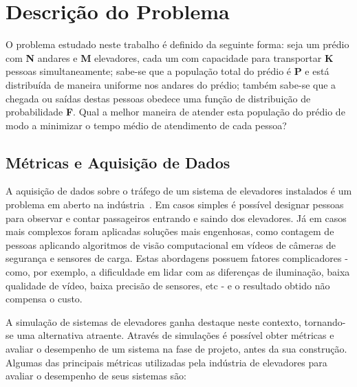 \chapter{\label{chap:problem}Descrição do Problema}

O problema estudado neste trabalho é definido da seguinte forma: seja um prédio com \textbf{N} andares e \textbf{M} elevadores, cada um com capacidade para transportar \textbf{K} pessoas simultaneamente; sabe-se que a população total do prédio é \textbf{P} e está distribuída de maneira uniforme nos andares do prédio; também sabe-se que a chegada ou saídas destas pessoas obedece uma função de distribuição de probabilidade \textbf{F}. Qual a melhor maneira de atender esta população do prédio de modo a minimizar o tempo médio de atendimento de cada pessoa?

\section{Métricas e Aquisição de Dados}

A aquisição de dados sobre o tráfego de um sistema de elevadores instalados é um problema em aberto na indústria~\cite{KOEHLEROTTIGER02}. Em casos simples é possível designar pessoas para observar e contar passageiros entrando e saindo dos elevadores. Já em casos mais complexos foram aplicadas soluções mais engenhosas, como contagem de pessoas aplicando algoritmos de visão computacional em vídeos de câmeras de segurança e sensores de carga. Estas abordagens possuem fatores complicadores - como, por exemplo, a dificuldade em lidar com as diferenças de iluminação, baixa qualidade de vídeo, baixa precisão de sensores, etc - e o resultado obtido não compensa o custo.

A simulação de sistemas de elevadores ganha destaque neste contexto, tornando-se uma alternativa atraente. Através de simulações é possível obter métricas e avaliar o desempenho de um sistema na fase de projeto, antes da sua construção. Algumas das principais métricas utilizadas pela indústria de elevadores para avaliar o desempenho de seus sistemas são:

